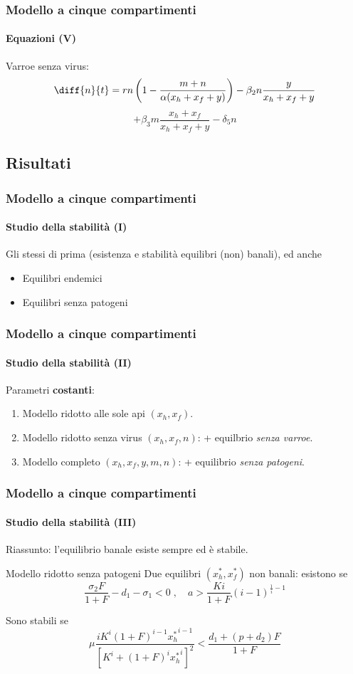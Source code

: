 \documentclass[]{beamer}
\begin{document}
\begin{frame}
    \frametitle{Modello a cinque compartimenti}
    \framesubtitle{Equazioni (V)}

    Varroe senza virus:
    $$\diff{n}{t} = rn \left( 1 - \frac{m+n}{ \alpha (x_h + x_f + y) } \right) - \beta_2 n \frac{y}{x_h + x_f + y}$$
    $$+ \beta_3 m \frac{x_h + x_f}{x_h + x_f + y} - \delta_5 n$$
\end{frame}


\subsection{Risultati}

\begin{frame}
    \frametitle{Modello a cinque compartimenti}
    \framesubtitle{Studio della stabilità (I)}

    Gli stessi di prima (esistenza e stabilità equilibri (non) banali), \pause
    ed anche
    \begin{itemize}
        \item Equilibri endemici
        \item \pause Equilibri senza patogeni
    \end{itemize}
\end{frame}

\begin{frame}
    \frametitle{Modello a cinque compartimenti}
    \framesubtitle{Studio della stabilità (II)}

    Parametri \textbf{costanti}:
    \begin{enumerate}
        \item \pause Modello ridotto alle sole api $(x_h, x_f)$.
        \item \pause Modello ridotto senza virus $(x_h, x_f, n)$: + equilbrio \emph{senza varroe}.
        \item \pause Modello completo $(x_h, x_f, y, m, n)$: + equilibrio \emph{senza patogeni}.
    \end{enumerate}
\end{frame}

\begin{frame}
    \frametitle{Modello a cinque compartimenti}
    \framesubtitle{Studio della stabilità (III)}

    Riassunto: l'equilibrio banale esiste sempre ed è stabile.


    \begin{block}{Modello ridotto senza patogeni}
        Due equilibri $(x_h^*, x_f^*)$ non banali: esistono se
        $$\frac{\sigma_2 F}{1+F} - d_1 - \sigma_1 <0 \; , \quad %
            a > \frac{Ki}{1+F} (i-1)^{\frac{1}{i} -1}$$

        \pause
        Sono stabili se
        $$\mu \frac{ i K^i (1+F)^{i-1}{x_h^*}^{i-1} }{ {\left[ K^i +(1+F)^i {x_h^*}^i \right]}^2 } %
            < \frac{d_1 + (p+d_2)F}{1+F}$$
    \end{block}
\end{frame}
\end{document}
